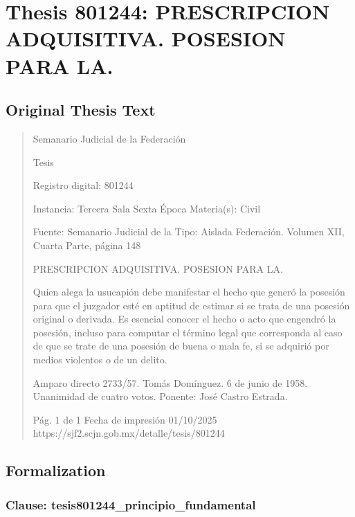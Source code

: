 \documentclass[11pt,a4paper]{article}
\begin{document}
\newpage

\section{Thesis 801244: PRESCRIPCION ADQUISITIVA. POSESION PARA LA.}
\label{thesis:801244}

\subsection{Original Thesis Text}

\begin{quote}
                                                   Semanario Judicial de la Federación

                                                  Tesis

 Registro digital: 801244

 Instancia: Tercera Sala          Sexta Época                           Materia(s): Civil

                                  Fuente: Semanario Judicial de la      Tipo: Aislada
                                  Federación.
                                  Volumen XII, Cuarta Parte, página
                                  148


PRESCRIPCION ADQUISITIVA. POSESION PARA LA.


Quien alega la usucapión debe manifestar el hecho que generó la posesión para que el juzgador
esté en aptitud de estimar si se trata de una posesión original o derivada. Es esencial conocer el
hecho o acto que engendró la posesión, incluso para computar el término legal que corresponda al
caso de que se trate de una posesión de buena o mala fe, si se adquirió por medios violentos o de
un delito.


Amparo directo 2733/57. Tomás Domínguez. 6 de junio de 1958. Unanimidad de cuatro votos.
Ponente: José Castro Estrada.




                                             Pág. 1 de 1              Fecha de impresión 01/10/2025
  https://sjf2.scjn.gob.mx/detalle/tesis/801244

\end{quote}

\subsection{Formalization}

\subsubsection{Clause: tesis801244\_principio\_fundamental}
\end{document}
